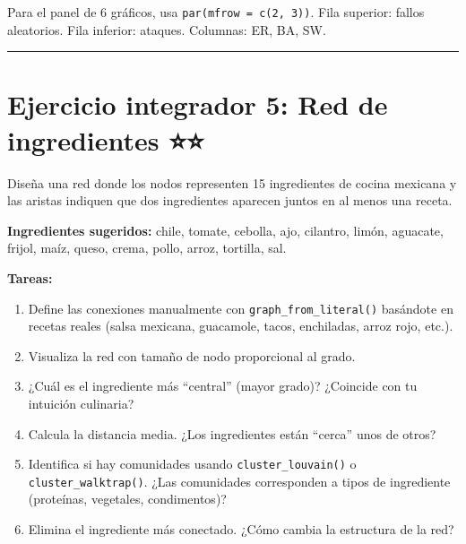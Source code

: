 \documentclass[
  letterpaper,
  DIV=11,
  numbers=noendperiod]{scrreprt}
\providecommand{\tightlist}{%
  \setlength{\itemsep}{0pt}\setlength{\parskip}{0pt}}
\begin{document}
\begin{tcolorbox}[enhanced jigsaw, toprule=.15mm, colframe=quarto-callout-note-color-frame, coltitle=black, titlerule=0mm, colback=white, breakable, leftrule=.75mm, arc=.35mm, bottomtitle=1mm, toptitle=1mm, rightrule=.15mm, bottomrule=.15mm, left=2mm, title=\textcolor{quarto-callout-note-color}{\faInfo}\hspace{0.5em}{💡 Pista 2}, colbacktitle=quarto-callout-note-color!10!white, opacityback=0, opacitybacktitle=0.6]

Para el panel de 6 gráficos, usa \texttt{par(mfrow\ =\ c(2,\ 3))}. Fila
superior: fallos aleatorios. Fila inferior: ataques. Columnas: ER, BA,
SW.

\end{tcolorbox}

\begin{center}\rule{0.5\linewidth}{0.5pt}\end{center}

\section*{Ejercicio integrador 5: Red de ingredientes
⭐⭐}\label{ejercicio-integrador-5-red-de-ingredientes}


Diseña una red donde los nodos representen 15 ingredientes de cocina
mexicana y las aristas indiquen que dos ingredientes aparecen juntos en
al menos una receta.

\textbf{Ingredientes sugeridos:} chile, tomate, cebolla, ajo, cilantro,
limón, aguacate, frijol, maíz, queso, crema, pollo, arroz, tortilla,
sal.

\textbf{Tareas:}

\begin{enumerate}
\def\labelenumi{\alph{enumi})}
\tightlist
\item
  Define las conexiones manualmente con \texttt{graph\_from\_literal()}
  basándote en recetas reales (salsa mexicana, guacamole, tacos,
  enchiladas, arroz rojo, etc.).
\item
  Visualiza la red con tamaño de nodo proporcional al grado.
\item
  ¿Cuál es el ingrediente más ``central'' (mayor grado)? ¿Coincide con
  tu intuición culinaria?
\item
  Calcula la distancia media. ¿Los ingredientes están ``cerca'' unos de
  otros?
\item
  Identifica si hay comunidades usando \texttt{cluster\_louvain()} o
  \texttt{cluster\_walktrap()}. ¿Las comunidades corresponden a tipos de
  ingrediente (proteínas, vegetales, condimentos)?
\item
  Elimina el ingrediente más conectado. ¿Cómo cambia la estructura de la
  red?
\end{enumerate}
\end{document}
